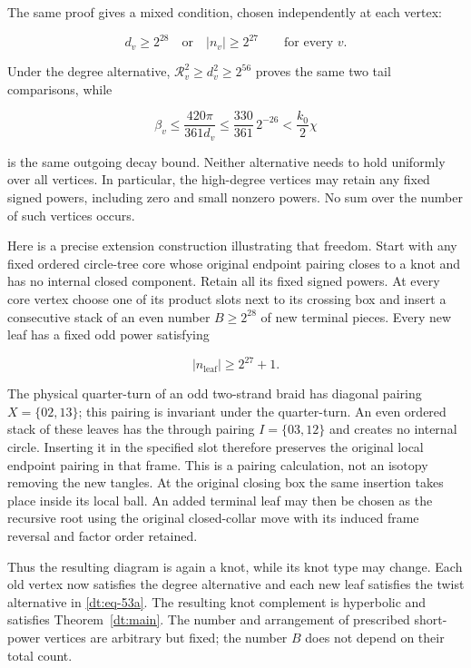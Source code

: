 The same proof gives a mixed condition, chosen independently at each
vertex:

\begin{equation}\label{dt:eq-53a}
\boxed{\qquad
       d_v\ge2^{28}\quad\text{or}\quad |n_v|\ge2^{27}
               \qquad\text{for every }v.\qquad}
\end{equation}

Under the degree alternative, \(\mathcal R_v^2\ge d_v^2\ge2^{56}\)
proves the same two tail comparisons, while

\begin{equation}\label{dt:eq-53b}
\beta_v\le\frac{420\pi}{361d_v}
             \le\frac{330}{361}\,2^{-26}
                    <\frac{k_0}2\chi
\end{equation}

is the same outgoing decay bound. Neither alternative needs to hold
uniformly over all vertices. In particular, the high-degree vertices
may retain any fixed signed powers, including zero and small nonzero
powers. No sum over the number of such vertices occurs.

Here is a precise extension construction illustrating that freedom.
Start with any fixed ordered circle-tree core whose original endpoint
pairing closes to a knot and has no internal closed component. Retain
all its fixed signed powers. At every core vertex choose one of its
product slots next to its crossing box and insert a consecutive
stack of an even number \(B\ge2^{28}\) of new terminal pieces. Every
new leaf has a fixed odd power satisfying

\begin{equation}\label{dt:eq-53c}
|n_{\mathrm{leaf}}|\ge2^{27}+1.
\end{equation}

The physical quarter-turn of an odd two-strand braid has diagonal
pairing \(X=\{02,13\}\); this pairing is invariant under the
quarter-turn. An even ordered stack of these leaves has the through
pairing \(I=\{03,12\}\) and creates no internal circle. Inserting it
in the specified slot therefore preserves the original local endpoint
pairing in that frame. This is a pairing calculation, not an
isotopy removing the new tangles. At the original closing box the same
insertion takes place inside its local ball. An added terminal leaf may
then be chosen as the recursive root using the original closed-collar
move with its induced frame reversal and factor order retained.

Thus the resulting diagram is again a knot, while its knot type may
change. Each old vertex now satisfies the degree alternative and each
new leaf satisfies the twist alternative in \eqref{dt:eq-53a}. The resulting
knot complement is hyperbolic and satisfies Theorem~\ref{dt:main}. The number and
arrangement of prescribed short-power vertices are arbitrary but fixed;
the number \(B\) does not depend on their total count.

